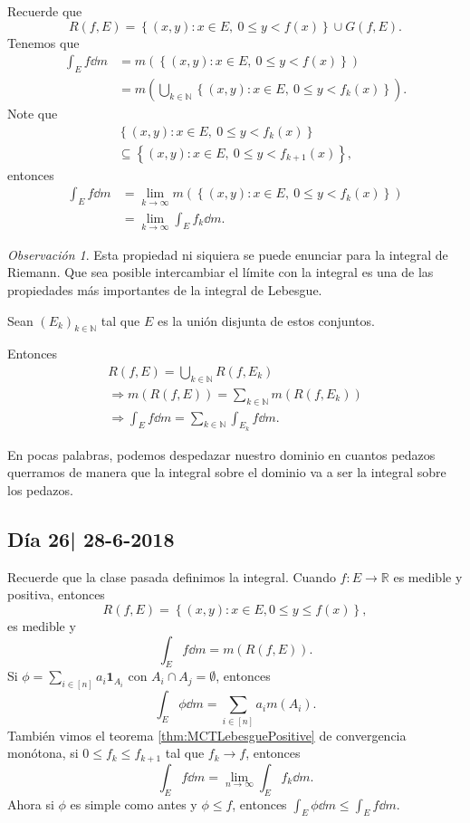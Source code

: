 \documentclass[12pt]{article}
\theoremstyle{plain}
\theoremstyle{definition}
\theoremstyle{remark}
\newtheorem{Rmk}[Th]{Observación}      %
\numberwithin{equation}{section}
\newcommand{\bN}{\mathbb{N}}        %
\newcommand{\bR}{\mathbb{R}}        %
\newcommand{\ind}{\mathbf{1}}       %
\renewcommand{\leq}{\leqslant}      %
\renewcommand{\:}{\colon}           %
\newcommand{\conj}[1]{\left\lbrace#1\right\rbrace}
\newcommand{\bonj}[1]{\left\lbrack#1\right\rbrack}
\begin{document}
\begin{multicols}{2}
\begin{ptcbp}
Recuerde que
$$R(f,E)=\conj{(x,y)\: x\in E,\ 0\leq y< f(x)}\cup G(f,E).$$
Tenemos que
\begin{align*}
  \int_{E}f\dd m &=m(\conj{(x,y)\: x\in E,\ 0\leq y< f(x)})\\
  &=m\left(\bigcup_{k\in\bN}\conj{(x,y)\: x\in E,\ 0\leq y< f_k(x)}\right).
\end{align*}
Note que
\begin{gather*}
  \conj{(x,y)\: x\in E,\ 0\leq y< f_k(x)}\\
  \subseteq\conj{(x,y)\: x\in E,\ 0\leq y< f_{k+1}(x)},
\end{gather*}
entonces
\begin{align*}
\int_{E}f\dd m&=\lim_{k\to\infty}m(\conj{(x,y)\: x\in E,\ 0\leq y< f_k(x)})\\
&=\lim_{k\to\infty}\int_{E}f_k\dd m.
\end{align*}
\end{ptcbp}

\begin{Rmk}
Esta propiedad ni siquiera se puede enunciar para la integral de Riemann. Que sea posible intercambiar el límite con la integral es una de las propiedades más importantes de la integral de Lebesgue.
\end{Rmk}

Sean $(E_k)_{k\in\bN}$ tal que $E$ es la unión disjunta de estos conjuntos.\par
Entonces
\begin{gather*}
  R(f,E)=\bigcup_{k\in\bN} R(f,E_k)\\
  \Rightarrow m(R(f,E))=\sum_{k\in\bN}m(R(f,E_k))\\
  \Rightarrow \int_{E}f\dd m=\sum_{k\in\bN}\int_{E_k}f\dd m.
\end{gather*}

En pocas palabras, podemos despedazar nuestro dominio en cuantos pedazos querramos de manera que la integral sobre el dominio va a ser la integral sobre los pedazos.

\subsection{Día 26| 28-6-2018}

Recuerde que la clase pasada definimos la integral. Cuando $f\:E\to\bR$ es medible y positiva, entonces
$$R(f,E) = \conj{(x,y)\: x\in E, 0\leq y\leq f(x)},$$
es medible y $$\int_Ef\dd m=m(R(f,E)).$$
Si $\phi=\sum_{i\in\bonj{n}}a_i\ind_{A_i}$ con $A_i\cap A_j=\emptyset$, entonces
$$\int_E\phi\dd m=\sum_{i\in\bonj{n}}a_im(A_i).$$
También vimos el teorema \ref{thm:MCTLebesguePositive} de convergencia monótona, si $0\leq f_k\leq f_{k+1}$ tal que $f_k\to f$, entonces $$\int_Ef\dd m=\lim_{n\to\infty}\int_Ef_k\dd m.$$
Ahora si $\phi$ es simple como antes y $\phi\leq f$, entonces $\int_E\phi\dd m\leq \int_Ef\dd m$.


\end{multicols}
\end{document}
